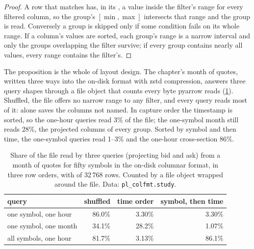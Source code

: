 \begin{proof}
A row that matches has, in its , a value inside the filter's range for every filtered column, so the group's
$[\min,\max]$ intersects that range and the group is read. Conversely a group is skipped only if some condition fails on its
whole range. If a column's values are sorted, each group's range is a narrow interval and only the groups overlapping the
filter survive; if every group contains nearly all values, every range contains the filter's.
\end{proof}

\label{lst:pl:columnar-formats:read}

The proposition is the whole of layout design. The chapter's month of quotes, written three ways into the on-disk format with
zstd compression, answers three query shapes through a file object that counts every byte pyarrow reads
(\cref{tab:pl:columnar-formats:queries}). Shuffled, the file offers no narrow range to any filter, and every query reads most of
it:  alone saves the columns not named. In capture order the timestamp is sorted, so the one-hour queries read
3\% of the file; the one-symbol month still reads 28\%, the projected columns of every group. Sorted by symbol and then time,
the one-symbol queries read 1--3\% and the one-hour cross-section 86\%.

\begin{table}[ht]
\centering\small
\begin{tabular}{lrrr}
\toprule
query & shuffled & time order & symbol, then time \\
\midrule
one symbol, one hour & 86.0\% & 3.30\% & 3.30\% \\
one symbol, one month & 34.1\% & 28.2\% & 1.07\% \\
all symbols, one hour & 81.7\% & 3.13\% & 86.1\% \\
\bottomrule
\end{tabular}
\caption{Share of the file read by three queries (projecting bid and ask) from a month of quotes for fifty symbols in the on-disk
columnar format, in three row orders, with  of 32\,768 rows. Counted by a file object wrapped around the file. Data:
\texttt{pl\_colfmt.study}.}\label{tab:pl:columnar-formats:queries}
\end{table}

